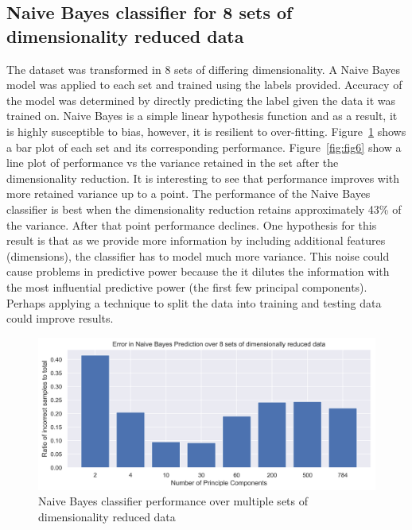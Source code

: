 \clearpage{}
\subsection{Naive Bayes classifier for 8 sets of dimensionality reduced data}

The dataset was transformed in 8 sets of differing dimensionality. A Naive Bayes model was applied to each set and trained using the labels provided. Accuracy of the model was determined by directly predicting the label given the data it was trained on. Naive Bayes is a simple linear hypothesis function and as a result, it is highly susceptible to bias, however, it is resilient to over-fitting.  Figure~\ref{fig:fig5} shows a bar plot of each set and its corresponding performance.  Figure~\ref{fig:fig6} show a line plot of performance vs the variance retained in the set after the dimensionality reduction. It is interesting to see that performance improves with more retained variance up to a point. The performance of the Naive Bayes classifier is best when the dimensionality reduction retains approximately 43\% of the variance. After that point performance declines. One hypothesis for this result is that as we provide more information by including additional features (dimensions), the classifier has to model much more variance. This noise could cause problems in predictive power because the it dilutes the information with the most influential predictive power (the first few principal components). Perhaps applying a technique to split the data into training and testing data could improve results.  
\begin{figure}[htb]
 \centering
\includegraphics[width=\textwidth]{assignment1/2-4-NBprediction_bar.png}
\caption{\label{fig:fig5}Naive Bayes classifier performance over multiple sets of dimensionality reduced data}
\end{figure}

